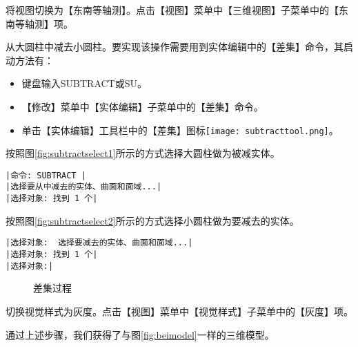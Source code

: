 \begin{procedure}
\item 将视图切换为【东南等轴测】。点击【视图】菜单中【三维视图】子菜单中的【东南等轴测】项。
\item 从大圆柱中减去小圆柱。要实现该操作需要用到实体编辑中的【差集】命令，其启动方法有：
\begin{itemize}
\item 键盘输入SUBTRACT或SU。
\item 【修改】菜单中【实体编辑】子菜单中的【差集】命令。
\item 单击【实体编辑】工具栏中的【差集】图标\texttt{[image: subtracttool.png]}。
\end{itemize}
按照图\ref{fig:subtractselect1}所示的方式选择大圆柱做为被减实体。
\begin{lstlisting}
|命令: SUBTRACT |
|选择要从中减去的实体、曲面和面域...|
|选择对象: 找到 1 个|
\end{lstlisting}
按照图\ref{fig:subtractselect2}所示的方式选择小圆柱做为要减去的实体。
\begin{lstlisting}
|选择对象:  选择要减去的实体、曲面和面域...|
|选择对象: 找到 1 个|
|选择对象:|
\end{lstlisting}
\begin{figure}[htbp]
\centering
{}\hspace{20pt}
\caption{差集过程}
\end{figure}
\item 切换视觉样式为灰度。点击【视图】菜单中【视觉样式】子菜单中的【灰度】项。
\end{procedure}

通过上述步骤，我们获得了与图\ref{fig:beimodel}一样的三维模型。


\endinput